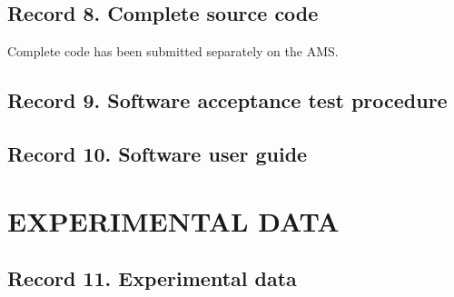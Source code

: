 \subsection{Record 8. Complete source code}
Complete code has been submitted separately on the AMS.


\subsection{Record 9. Software acceptance test procedure}


\subsection{Record 10. Software user guide}



\section{EXPERIMENTAL DATA}

\subsection{Record 11. Experimental data}




